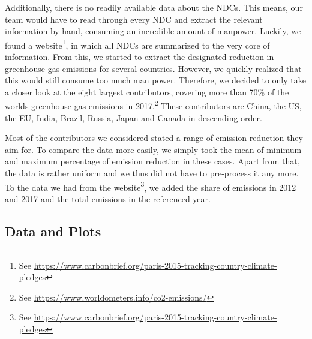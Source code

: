 Additionally, there is no readily available data about the NDCs. This means, our team would have to read through every NDC and extract the relevant information by hand, consuming an incredible amount of manpower. Luckily, we found a website\footnote{See \url{https://www.carbonbrief.org/paris-2015-tracking-country-climate-pledges}}, in which  all NDCs are summarized to the very core of information. From this, we started to extract the  designated reduction in greenhouse gas emissions for several countries. However, we quickly realized that this would still consume too much man power. Therefore, we decided to only take a closer look at the eight largest contributors, covering more than 70\% of the worlds greenhouse gas emissions in 2017.\footnote{See \url{https://www.worldometers.info/co2-emissions/}} These contributors are China, the US, the EU, India, Brazil, Russia, Japan and Canada in descending order.

Most of the contributors we considered stated a range of emission reduction they aim for. To compare the data more easily, we simply took the mean of minimum and maximum percentage of emission reduction in these cases. Apart from that, the data is rather uniform and we thus did not have to  pre-process it any more. To the data we had from the website\footnote{See \url{https://www.carbonbrief.org/paris-2015-tracking-country-climate-pledges}}, we added the share of   emissions in 2012 and 2017 and the total   emissions in the referenced year.

\subsection{Data and Plots}

